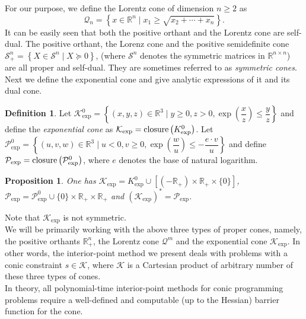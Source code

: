 \documentclass[10pt]{article}
\theoremstyle{definition}
\newtheorem{defin}{Definition}
\theoremstyle{plain}
\newtheorem{prop}{Proposition}
\begin{document}
For our purpose, we define the \textnormal{Lorentz cone} of dimension $n\geq 2$ as
\[\mathcal{Q}_n = \left\{ x \in \mathbb{R}^n \mid x_1 \geq \sqrt{x_2+\cdots+x_n} \right\}.\]
It can be easily seen that both the positive orthant and the Lorentz cone are self-dual. The positive orthant, the Lorenz cone and the positive semidefinite cone $\mathcal{S}^n_+ = \left\{ X \in \mathcal{S}^{n} \mid X\succeq 0 \right\}$, (where $\mathcal{S}^n$ denotes the symmetric matrices in $\mathbb{R}^{n\times n}$) are all proper and self-dual. They are sometimes referred to as \textit{symmetric cones}. \\

Next we define the exponential cone and give analytic expressions of it and its dual cone.

\begin{defin}
	Let $\mathcal{K}^0_{\exp} = \left\{(x, y, z) \in \mathbb{R}^3 \mid y \geq 0, z > 0, \exp\left(\dfrac{x}{z}\right) \leq \dfrac{y}{z}\right\}$
	and define the \textit{exponential cone} as
	$\mathcal{K}_{\exp} = \textnormal{closure}\left(K^0_{\exp}\right)$. Let $\mathcal{P}^0_{\exp} = \left\{(u,v,w) \in \mathbb{R}^3 \mid u<0, v \geq 0, \exp\left(\dfrac{w}{u}\right)\leq -\dfrac{e\cdot v}{u} \right\}$
	and define $\mathcal{P}_{\exp} = \textnormal{closure} \left(\mathcal{P}^0_{\exp}\right)$,
	where $e$ denotes the base of natural logarithm. 
\end{defin}
\begin{prop}\label{K_exp=K0_exp_union_something}
	One has $\mathcal{K}_{\exp} = K^0_{\exp} \cup \left[\left(-\mathbb{R}_+\right) \times \mathbb{R}_+ \times \{0\} \right]$, $\mathcal{P}_{\exp} = \mathcal{P}^0_{\exp} \cup \{0\} \times \mathbb{R}_+ \times \mathbb{R}_+$ and $ (\mathcal{K}_{\exp})^* = \mathcal{P}_{\exp}$.
\end{prop}
Note that $\mathcal{K}_{\exp}$ is not symmetric. \\

We will be primarily working with the above three types of proper cones, namely, the positive orthants $\mathbb{R}_+^{n}$, the Lorentz cone $\mathcal{Q}^m$ and the exponential cone $\mathcal{K}_{\exp}$. In other words, the interior-point method we present deals with problems with a conic constraint $s \in \mathcal{K}$, where $\mathcal{K}$ is a Cartesian product of arbitrary number of these three types of cones.\\

In theory, all polynomial-time interior-point methods for conic programming problems require a well-defined and computable (up to the Hessian) barrier function for the cone.
\end{document}

